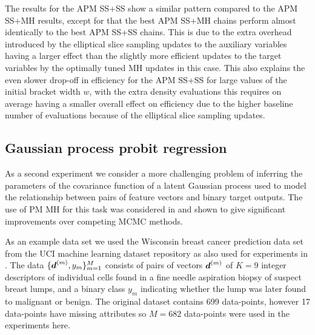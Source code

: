 The results for the \ac{APM} \ac{SS}+\ac{SS} show a similar pattern compared to the \ac{APM} \ac{SS}+\ac{MH} results, except for that the best \ac{APM} \ac{SS}+\ac{MH} chains perform almost identically to the best \ac{APM} \ac{SS}+\ac{SS} chains. This is due to the extra overhead introduced by the elliptical slice sampling updates to the auxiliary variables having a larger effect than the slightly more efficient updates to the target variables by the optimally tuned \ac{MH} updates in this case. This also explains the even slower drop-off in efficiency for the \ac{APM} \ac{SS}+\ac{SS} for large values of the initial bracket width $w$, with the extra density evaluations this requires on average having a smaller overall effect on efficiency due to the higher baseline number of evaluations because of the elliptical slice sampling updates.

\subsection{Gaussian process probit regression}\label{subsec:pm-gaussian-process-classifier-exp}

As a second experiment we consider a more challenging problem of inferring the parameters of the covariance function of a latent Gaussian process used to model the relationship between pairs of feature vectors and binary target outputs. The use of \ac{PM} \ac{MH} for this task was considered in \citep{filippone2014pseudo} and shown to give significant improvements over competing \ac{MCMC} methods. 

As an example data set we used the Wisconsin breast cancer prediction data set \citep{mangasarian1995breast} from the UCI machine learning dataset repository \citep{lichman2013uci} as also used for experiments in \citep{filippone2014pseudo}. The data $\lbrace \boldsymbol{d}^{(m)},y_m \rbrace_{m=1}^M$ consists of pairs of vectors $\boldsymbol{d}^{(m)}$ of $K=9$ integer descriptors of individual cells found in a fine needle aspiration biopsy of suspect breast lumps, and a binary class $y_m$ indicating whether the lump was later found to malignant or benign. The original dataset contains 699 data-points, however 17 data-points have missing attributes so $M=682$ data-points were used in the experiments here.

